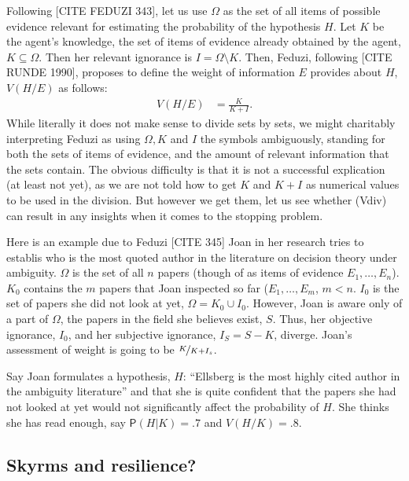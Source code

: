 \documentclass[
  10pt,
  dvipsnames,enabledeprecatedfontcommands]{scrartcl}
\newcommand{\pr}[1]{\mathsf{P}(#1)}
\begin{document}
Following {[}CITE FEDUZI 343{]}, let us use \(\Omega\) as the set of all
items of possible evidence relevant for estimating the probability of
the hypothesis \(H\). Let \(K\) be the agent's knowledge, the set of
items of evidence already obtained by the agent, \(K \subseteq \Omega\).
Then her relevant ignorance is \(I = \Omega \setminus K\). Then, Feduzi,
following {[}CITE RUNDE 1990{]}, proposes to define the weight of
information \(E\) provides about \(H\), \(V(H/E)\) as follows:
\begin{align} \tag{Vdiv}  V(H/E) & = \frac{K}{K+I}.\end{align}
\noindent While literally it does not make sense to divide sets by sets,
we might charitably interpreting Feduzi as using \(\Omega, K\) and \(I\)
the symbols ambiguously, standing for both the sets of items of
evidence, and the amount of relevant information that the sets contain.
The obvious difficulty is that it is not a successful explication (at
least not yet), as we are not told how to get \(K\) and \(K+I\) as
numerical values to be used in the division. But however we get them,
let us see whether (Vdiv) can result in any insights when it comes to
the stopping problem.

Here is an example due to Feduzi {[}CITE 345{]} Joan in her research
tries to establis who is the most quoted author in the literature on
decision theory under ambiguity. \(\Omega\) is the set of all \(n\)
papers (though of as items of evidence \(E_1, \dots, E_n\)). \(K_0\)
contains the \(m\) papers that Joan inspected so far
(\(E_1, \dots, E_m\), \(m<n\). \(I_0\) is the set of papers she did not
look at yet, \(\Omega = K_0 \cup I_0\). However, Joan is aware only of a
part of \(\Omega\), the papers in the field she believes exist, \(S\).
Thus, her objective ignorance, \(I_0\), and her subjective ignorance,
\(I_S = S- K\), diverge. Joan's assessment of weight is going to be
\(\nicefrac{K}{K+I_s}\).

Say Joan formulates a hypothesis, \(H\): ``Ellsberg is the most highly
cited author in the ambiguity literature'' and that she is quite
confident that the papers she had not looked at yet would not
significantly affect the probability of \(H\). She thinks she has read
enough, say \(\pr{H \vert K} = .7\) and \(V(H/K) = .8\).

\hypertarget{skyrms-and-resilience}{%
\subsection{Skyrms and resilience?}\label{skyrms-and-resilience}}
\end{document}
